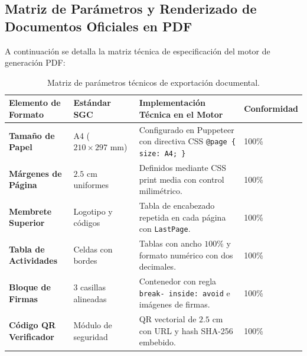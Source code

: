 \documentclass[12pt,a4paper]{article}
\begin{document}
\subsection{Matriz de Parámetros y Renderizado de Documentos Oficiales en PDF}
A continuación se detalla la matriz técnica de especificación del motor de generación PDF:
\begin{table}[H]
\centering
\small
\renewcommand{\arraystretch}{1.2}
\begin{tabularx}{\textwidth}{|>{\hsize=0.9\hsize\raggedright\arraybackslash\bfseries\footnotesize}X|>{\hsize=0.8\hsize\raggedright\arraybackslash\footnotesize}X|>{\hsize=1.7\hsize\raggedright\arraybackslash\footnotesize}X|>{\hsize=0.6\hsize\centering\arraybackslash\footnotesize}X|}
\hline
\rowcolor{tableheader}
\textbf{Elemento de Formato} & \textbf{Estándar SGC} & \textbf{Implementación Técnica en el Motor} & \textbf{Conformidad} \\
\hline
Tamaño de Papel & A4 ($210 \times 297\text{ mm}$) & Configurado en Puppeteer con directiva CSS \texttt{@page \{ size: A4; \}} & 100\% \\
\hline
Márgenes de Página & $2.5\text{ cm}$ uniformes & Definidos mediante CSS print media con control milimétrico. & 100\% \\
\hline
Membrete Superior & Logotipo y códigos & Tabla de encabezado repetida en cada página con \texttt{LastPage}. & 100\% \\
\hline
Tabla de Actividades & Celdas con bordes & Tablas con ancho $100\%$ y formato numérico con dos decimales. & 100\% \\
\hline
Bloque de Firmas & 3 casillas alineadas & Contenedor con regla \texttt{break- inside: avoid} e imágenes de firmas. & 100\% \\
\hline
Código QR Verificador & Módulo de seguridad & QR vectorial de $2.5\text{ cm}$ con URL y hash SHA-256 embebido. & 100\% \\
\hline
\end{tabularx}
\caption{Matriz de parámetros técnicos de exportación documental.}
\label{tab:export_matrix}
\end{table}
\end{document}
